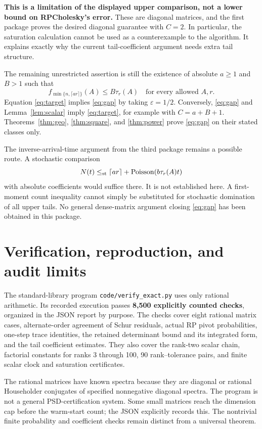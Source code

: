 \documentclass[11pt]{article}
\theoremstyle{remark}\newtheorem{remark}[theorem]{Remark}
\newcommand{\eps}{\varepsilon}
\begin{document}
\textbf{This is a limitation of the displayed upper comparison, not a lower bound on RPCholesky's error.} These are diagonal matrices, and the first package proves the desired diagonal guarantee with $C=2$. In particular, the saturation calculation cannot be used as a counterexample to the algorithm. It explains exactly why the current tail-coefficient argument needs extra tail structure.

The remaining unrestricted assertion is still the existence of absolute $a\ge1$ and $B>1$ such that
\begin{equation}
 f_{\min\{n,\lceil ar\rceil\}}(A)\le B\tau_r(A)
 \quad\text{for every allowed }A,r. \label{eq:gap}
\end{equation}
Equation \eqref{eq:target} implies \eqref{eq:gap} by taking $\eps=1/2$. Conversely, \eqref{eq:gap} and Lemma~\ref{lem:scalar} imply \eqref{eq:target}, for example with $C=a+B+1$. Theorems~\ref{thm:geo}, \ref{thm:square}, and \ref{thm:power} prove \eqref{eq:gap} on their stated classes only.

The inverse-arrival-time argument from the third package remains a possible route. A stochastic comparison
\[
 N(t)\le_{\rm st}\lceil ar\rceil+\operatorname{Poisson}(b\tau_r(A)t)
\]
with absolute coefficients would suffice there. It is not established here. A first-moment count inequality cannot simply be substituted for stochastic domination of all upper tails. No general dense-matrix argument closing \eqref{eq:gap} has been obtained in this package.

\section{Verification, reproduction, and audit limits}
The standard-library program \texttt{code/verify\_exact.py} uses only rational arithmetic. Its recorded execution passes \textbf{8,500 explicitly counted checks}, organized in the JSON report by purpose. The checks cover eight rational matrix cases, alternate-order agreement of Schur residuals, actual RP pivot probabilities, one-step trace identities, the retained determinant bound and its integrated form, and the tail coefficient estimates. They also cover the rank-two scalar chain, factorial constants for ranks 3 through 100, 90 rank--tolerance pairs, and finite scalar clock and saturation certificates.

The rational matrices have known spectra because they are diagonal or rational Householder conjugates of specified nonnegative diagonal spectra. The program is not a general PSD-certification system. Some small matrices reach the dimension cap before the warm-start count; the JSON explicitly records this. The nontrivial finite probability and coefficient checks remain distinct from a universal theorem.
\end{document}
